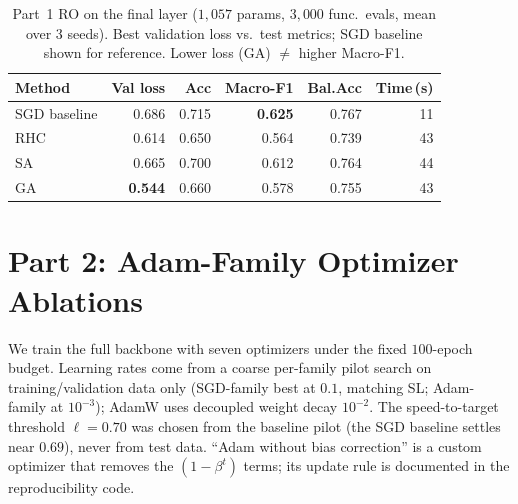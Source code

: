 \documentclass[letterpaper, 10pt, conference]{ieeeconf}
\begin{document}
\begin{table}[t]
\caption{Part~1 RO on the final layer ($1{,}057$ params, $3{,}000$ func.\ evals,
  mean over 3 seeds). Best validation loss vs.\ test metrics; SGD baseline shown
  for reference. Lower loss (GA) $\ne$ higher Macro-F1.}
\label{tab:ro}
\centering\small
\begin{tabular}{@{}lrrrrr@{}}
\toprule
Method & Val loss & Acc & Macro-F1 & Bal.Acc & Time\,(s) \\
\midrule
SGD baseline & 0.686 & 0.715 & \textbf{0.625} & 0.767 & 11 \\
RHC          & 0.614 & 0.650 & 0.564 & 0.739 & 43 \\
SA           & 0.665 & 0.700 & 0.612 & 0.764 & 44 \\
GA           & \textbf{0.544} & 0.660 & 0.578 & 0.755 & 43 \\
\bottomrule
\end{tabular}
\end{table}

\section{Part 2: Adam-Family Optimizer Ablations}
\label{sec:part2}

We train the full backbone with seven optimizers under the fixed $100$-epoch
budget. Learning rates come from a coarse per-family pilot search on
training/validation data only (SGD-family best at $0.1$, matching SL;
Adam-family at $10^{-3}$); AdamW uses decoupled weight decay $10^{-2}$. The
speed-to-target threshold $\ell{=}0.70$ was chosen from the baseline pilot (the
SGD baseline settles near $0.69$), never from test data. ``Adam without bias
correction'' is a custom optimizer that removes the $(1-\beta^t)$ terms; its
update rule is documented in the reproducibility code.
\end{document}
